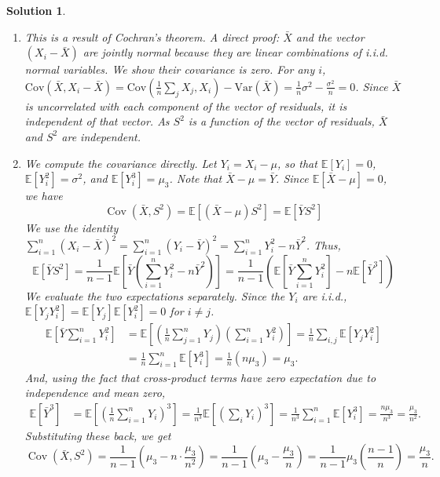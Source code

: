 \documentclass[12pt]{amsart}
\newtheorem*{solution}{Solution}
\begin{document}
\begin{solution}
\begin{enumerate}[label=(\alph*)]
\item This is a result of Cochran's theorem. A direct proof: $\bar{X}$ and the vector $(X_i-\bar{X})$ are jointly normal because they are linear combinations of i.i.d. normal variables. We show their covariance is zero. For any $i$,
$\text{Cov}(\bar{X}, X_i-\bar{X}) = \text{Cov}(\frac{1}{n}\sum_j X_j, X_i) - \text{Var}(\bar{X}) = \frac{1}{n}\sigma^2 - \frac{\sigma^2}{n} = 0$.
Since $\bar{X}$ is uncorrelated with each component of the vector of residuals, it is independent of that vector. As $S^2$ is a function of the vector of residuals, $\bar{X}$ and $S^2$ are independent.
\item We compute the covariance directly. Let $Y_i = X_i - \mu$, so that $\mathbb{E}[Y_i]=0$, $\mathbb{E}[Y_i^2]=\sigma^2$, and $\mathbb{E}[Y_i^3]=\mu_3$. Note that $\bar{X}-\mu = \bar{Y}$. Since $\mathbb{E}[\bar{X}-\mu]=0$, we have
$$
\operatorname{Cov}(\bar{X}, S^2) = \mathbb{E}[(\bar{X}-\mu)S^2] = \mathbb{E}[\bar{Y}S^2]
$$
We use the identity $\sum_{i=1}^n(X_i-\bar{X})^2 = \sum_{i=1}^n(Y_i-\bar{Y})^2 = \sum_{i=1}^n Y_i^2 - n\bar{Y}^2$. Thus,
$$
\mathbb{E}[\bar{Y}S^2] = \frac{1}{n-1}\mathbb{E}\left[\bar{Y}\left(\sum_{i=1}^n Y_i^2 - n\bar{Y}^2\right)\right] = \frac{1}{n-1} \left( \mathbb{E}\left[\bar{Y}\sum_{i=1}^n Y_i^2\right] - n\mathbb{E}[\bar{Y}^3] \right)
$$
We evaluate the two expectations separately. Since the $Y_i$ are i.i.d., $\mathbb{E}[Y_j Y_i^2]= \mathbb{E}[Y_j]\mathbb{E}[Y_i^2] = 0$ for $i \neq j$.
\begin{align*}
\mathbb{E}\left[\bar{Y}\sum_{i=1}^n Y_i^2\right] &= \mathbb{E}\left[\left(\frac{1}{n}\sum_{j=1}^n Y_j\right)\left(\sum_{i=1}^n Y_i^2\right)\right] = \frac{1}{n}\sum_{i,j} \mathbb{E}[Y_j Y_i^2] \\
&= \frac{1}{n} \sum_{i=1}^n \mathbb{E}[Y_i^3] = \frac{1}{n} (n\mu_3) = \mu_3.
\end{align*}
And, using the fact that cross-product terms have zero expectation due to independence and mean zero,
\begin{align*}
\mathbb{E}[\bar{Y}^3] &= \mathbb{E}\left[\left(\frac{1}{n}\sum_{i=1}^n Y_i\right)^3\right] = \frac{1}{n^3} \mathbb{E}\left[ \left(\sum_i Y_i\right)^3 \right] = \frac{1}{n^3} \sum_{i=1}^n \mathbb{E}[Y_i^3] = \frac{n\mu_3}{n^3} = \frac{\mu_3}{n^2}.
\end{align*}
Substituting these back, we get
$$
\operatorname{Cov}(\bar{X}, S^2) = \frac{1}{n-1} \left(\mu_3 - n \cdot \frac{\mu_3}{n^2}\right) = \frac{1}{n-1}\left(\mu_3 - \frac{\mu_3}{n}\right) = \frac{1}{n-1}\mu_3\left(\frac{n-1}{n}\right) = \frac{\mu_3}{n}.
$$
\end{enumerate}
\end{solution}
\end{document}
